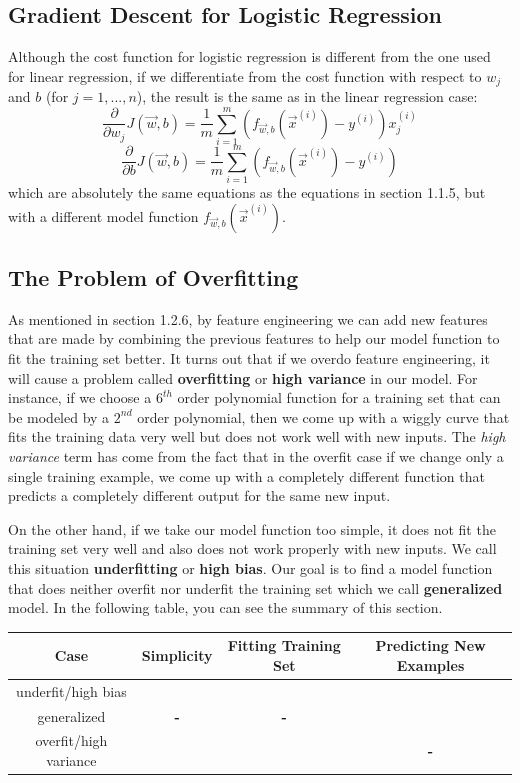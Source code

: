\documentclass[a4paper, 12pt]{book}
\newcommand{\cmark}{\ding{51}}
\newcommand{\xmark}{\ding{55}}
\begin{document}
\subsection{Gradient Descent for Logistic Regression}
Although the cost function for logistic regression is different from the one used for linear regression, if we differentiate from the cost function with respect to $w_j$ and $b$ (for $j=1,...,n$), the result is the same as in the linear regression case:
\[{\frac{\partial}{\partial w_j}}J(\Vec{w},b) = \frac{1}{m} \sum_{i=1}^{m} (f_{\Vec{w},b}(\Vec{x}^{(i)}) - y^{(i)})x_j^{(i)}\]
\[{\frac{\partial}{\partial b}}J(\Vec{w},b) = \frac{1}{m} \sum_{i=1}^{m} (f_{\Vec{w},b}(\Vec{x}^{(i)}) - y^{(i)})\]
which are absolutely the same equations as the equations in section 1.1.5, but with a different model function $f_{\Vec{w},b}(\Vec{x}^{(i)})$.
\subsection{The Problem of Overfitting}
As mentioned in section 1.2.6, by feature engineering we can add new features that are made by combining the previous features to help our model function to fit the training set better. It turns out that if we overdo feature engineering, it will cause a problem called \textbf{overfitting} or \textbf{high variance} in our model. For instance, if we choose a $6^{th}$ order polynomial function for a training set that can be modeled by a $2^{nd}$ order polynomial, then we come up with a wiggly curve that fits the training data very well but does not work well with new inputs. The \emph{high variance} term has come from the fact that in the overfit case if we change only a single training example, we come up with a completely different function that predicts a completely different output for the same new input.

On the other hand, if we take our model function too simple, it does not fit the training set very well and also does not work properly with new inputs. We call this situation \textbf{underfitting} or \textbf{high bias}. Our goal is to find a model function that does neither overfit nor underfit the training set which we call \textbf{generalized} model. In the following table, you can see the summary of this section.
\renewcommand{\arraystretch}{1.8}
\begin{center}
\begin{tabular}{|c||c|c|c|}
    \hline
    Case & Simplicity & Fitting Training Set & Predicting New Examples \\
    \hline \hline
    underfit/high bias & \cmark & \xmark & \xmark \\
    \hline
    generalized & \textbf{-} & \textbf{-} & \cmark \\
    \hline
    overfit/high variance & \xmark & \cmark & \textbf{-} \\
    \hline
\end{tabular}
\end{center}
\end{document}
